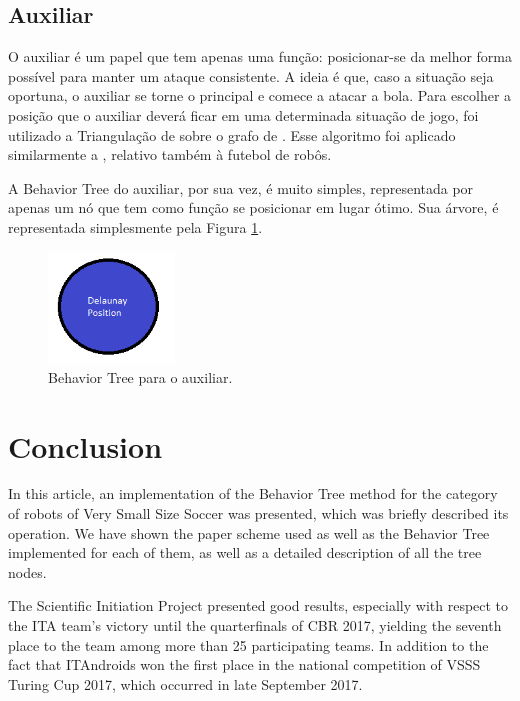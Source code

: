 \documentclass[conference]{IEEEtran}
\begin{document}
\subsection{Auxiliar}

	O auxiliar é um papel que tem apenas uma função: posicionar-se da melhor forma possível para manter um ataque consistente. A ideia é que, caso a situação seja oportuna, o auxiliar se torne o principal e comece a atacar a bola. Para escolher a posição que o auxiliar deverá ficar em uma determinada situação de jogo, foi utilizado a Triangulação de \cite{delaunay34} sobre o grafo de \cite{voronoi08}. Esse algoritmo foi aplicado similarmente a \cite{akiyama2007multi}, relativo também à futebol de robôs.

	A Behavior Tree do auxiliar, por sua vez, é muito simples, representada por apenas um nó que tem como função se posicionar em lugar ótimo. Sua árvore, é representada simplesmente pela Figura \ref{fig:auxiliar_bt}.

\begin{figure}[H]
	\centering
	\includegraphics[width=0.3\textwidth]{figures/Auxiliar_BT.png}
   \caption{Behavior Tree para o auxiliar.} \label{fig:auxiliar_bt}
\end{figure}


\section{Conclusion}
	In this article, an implementation of the Behavior Tree method for the category of robots of Very Small Size Soccer was presented, which was briefly described its operation. We have shown the paper scheme used as well as the Behavior Tree implemented for each of them, as well as a detailed description of all the tree nodes.

The Scientific Initiation Project presented good results, especially with respect to the ITA team's victory until the quarterfinals of CBR 2017, yielding the seventh place to the team among more than 25 participating teams. In addition to the fact that ITAndroids won the first place in the national competition of VSSS Turing Cup 2017, which occurred in late September 2017.
\end{document}
